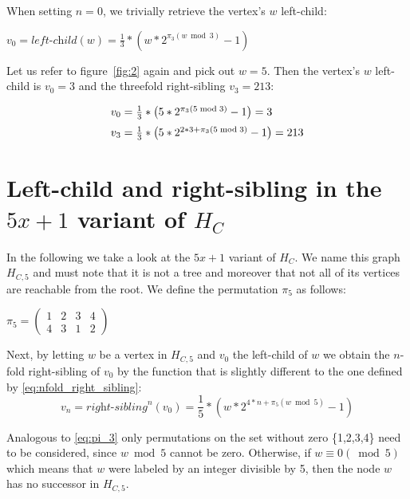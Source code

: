 \par\medskip
\noindent
When setting $n=0$, we trivially retrieve the vertex's $w$ left-child:
\begin{center}
	$v_0=\textit{left-child}(w)=\frac{1}{3}*\left(w*2^{\pi_3(w\bmod 3)}-1\right)$
\end{center}

\begin{example}
	\label{ex:siblings}
	Let us refer to figure~\ref{fig:2} again and pick out $w=5$. Then the
	vertex's $w$ left-child is $v_0=3$ and the threefold right-sibling
	$v_3=213$:

	\begin{equation*}
	\begin{array}{l}
		v_0=\frac{1}{3}*\left(5*2^{\pi_3(5\bmod 3)}-1\right)=3
		\\[\medskipamount]
		v_3=\frac{1}{3}*\left(5*2^{2*3+\pi_3(5\bmod 3)}-1\right)=213
	\end{array}
	\end{equation*}
\end{example}

\section{Left-child and right-sibling in the \mbox{$5x+1$} variant of \mbox{$H_C$}}
In the following we take a look at the $5x+1$ variant of $H_C$. We name this graph $H_{C,5}$ and must note that it is not a tree and moreover that not all of its vertices are reachable from the root. We define the permutation $\pi_5$ as follows:
\begin{center}
	$\pi_5=\left(\begin{array}{cccc}
		1 & 2 & 3 & 4\\
		4 & 3 & 1 & 2
	\end{array}\right)$	
\end{center}

Next, by letting $w$ be a vertex in $H_{C,5}$ and $v_0$ the left-child of $w$
we obtain the $n$-fold right-sibling of $v_0$ by the function that
is slightly different to the one defined by \ref{eq:nfold_right_sibling}:
\begin{equation}
\label{eq:nfold_right_sibling_5}
	v_n=\textit{right-sibling}^n(v_0)=\frac{1}{5}*\left(w*2^{4*n+\pi_5(w\bmod 5)}-1\right)
\end{equation}

Analogous to \ref{eq:pi_3} only permutations on the set without zero
\{1,2,3,4\} need to be considered, since $w\bmod 5$ cannot be zero.
Otherwise, if $w\equiv 0 (\bmod 5)$ which means that $w$ were labeled
by an integer divisible by 5, then the node $w$ has no successor in $H_{C,5}$.

